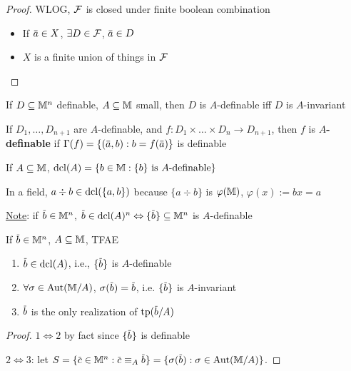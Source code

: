 \documentclass[11pt]{article}
\begin{document}
\begin{proof}
WLOG, \(\mathcal{F}\) is closed under finite boolean combination

\begin{itemize}
\item If \(\bara\in X\), \(\exists D\in\mathcal{F}\), \(\bara\in D\)
\item \(X\) is a finite union of things in \(\mathcal{F}\)
\end{itemize}
\end{proof}

\begin{fact}[\ref{3.10.10}]
If \(D\subseteq\mathbb{M}^n\) definable, \(A\subseteq\mathbb{M}\) small, then \(D\) is \(A\)-definable iff \(D\) is \(A\)-invariant
\end{fact}

\begin{definition}[]
If \(D_1,\dots,D_{n+1}\) are \(A\)-definable, and \(f:D_1\times\dots\times D_n\to D_{n+1}\), then \(f\) is
\textbf{\(A\)-definable} if \(\Gamma(f)=\{(\bara,b):b=f(\bara)\}\) is definable
\end{definition}

\begin{definition}[]
If \(A\subseteq\mathbb{M}\), \(\operatorname{dcl}(A)=\{b\in\mathbb{M}:\{b\}\text{ is $A$-definable}\}\)
\end{definition}

\begin{examplle}[]
In a field, \(a\div b\in\operatorname{dcl}(\{a,b\})\) because \(\{a\div b\}\) is \(\varphi(\mathbb{M})\), \(\varphi(x):=bx=a\)
\end{examplle}

\uline{Note}: if \(\barb\in\M^n\), \(\barb\in\dcl(A)^n\Leftrightarrow\{\barb\}\subseteq\M^n\) is \(A\)-definable


\begin{proposition}[]
\label{4.7.5}
If \(\barb\in\M^n\), \(A\subseteq\mathbb{M}\), TFAE
\begin{enumerate}
\item \(\barb\in\dcl(A)\), i.e., \(\{\barb\}\) is \(A\)-definable
\item \(\forall \sigma\in\operatorname{\text{Aut}}(\mathbb{M}/A)\), \(\sigma(\barb)=\barb\), i.e. \(\{\barb\}\) is \(A\)-invariant
\item \(\barb\) is the only realization of \(\tp(\barb/A)\)
\end{enumerate}
\end{proposition}

\begin{proof}
\(1\Leftrightarrow 2\) by fact since \(\{\barb\}\) is definable

\(2\Leftrightarrow 3\): let \(S=\{\barc\in\M^n:\barc\equiv_A\barb\}=\{\sigma(\barb):\sigma\in\Aut(\M/A)\}\).
\end{proof}
\end{document}
